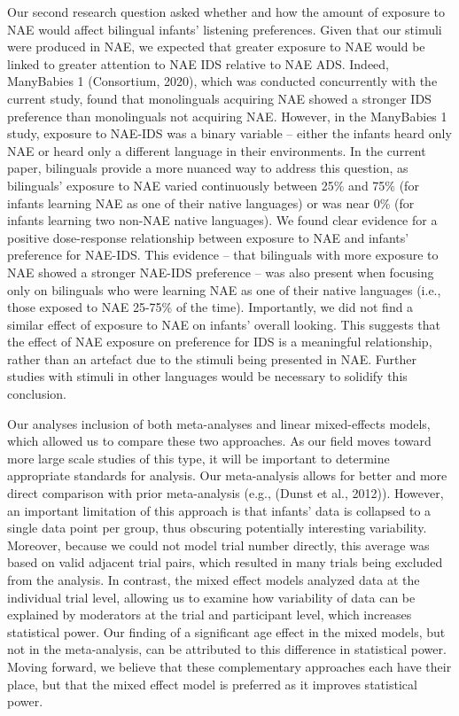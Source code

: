 \documentclass[,man,floatsintext]{apa6}
\begin{document}
Our second research question asked whether and how the amount of exposure to NAE would affect bilingual infants' listening preferences. Given that our stimuli were produced in NAE, we expected that greater exposure to NAE would be linked to greater attention to NAE IDS relative to NAE ADS. Indeed, ManyBabies 1 (Consortium, 2020), which was conducted concurrently with the current study, found that monolinguals acquiring NAE showed a stronger IDS preference than monolinguals not acquiring NAE. However, in the ManyBabies 1 study, exposure to NAE-IDS was a binary variable -- either the infants heard only NAE or heard only a different language in their environments. In the current paper, bilinguals provide a more nuanced way to address this question, as bilinguals' exposure to NAE varied continuously between 25\% and 75\% (for infants learning NAE as one of their native languages) or was near 0\% (for infants learning two non-NAE native languages). We found clear evidence for a positive dose-response relationship between exposure to NAE and infants' preference for NAE-IDS. This evidence -- that bilinguals with more exposure to NAE showed a stronger NAE-IDS preference -- was also present when focusing only on bilinguals who were learning NAE as one of their native languages (i.e., those exposed to NAE 25-75\% of the time). Importantly, we did not find a similar effect of exposure to NAE on infants' overall looking. This suggests that the effect of NAE exposure on preference for IDS is a meaningful relationship, rather than an artefact due to the stimuli being presented in NAE. Further studies with stimuli in other languages would be necessary to solidify this conclusion.

Our analyses inclusion of both meta-analyses and linear mixed-effects models, which allowed us to compare these two approaches. As our field moves toward more large scale studies of this type, it will be important to determine appropriate standards for analysis. Our meta-analysis allows for better and more direct comparison with prior meta-analysis (e.g., (Dunst et al., 2012)). However, an important limitation of this approach is that infants' data is collapsed to a single data point per group, thus obscuring potentially interesting variability. Moreover, because we could not model trial number directly, this average was based on valid adjacent trial pairs, which resulted in many trials being excluded from the analysis. In contrast, the mixed effect models analyzed data at the individual trial level, allowing us to examine how variability of data can be explained by moderators at the trial and participant level, which increases statistical power. Our finding of a significant age effect in the mixed models, but not in the meta-analysis, can be attributed to this difference in statistical power. Moving forward, we believe that these complementary approaches each have their place, but that the mixed effect model is preferred as it improves statistical power.
\end{document}
